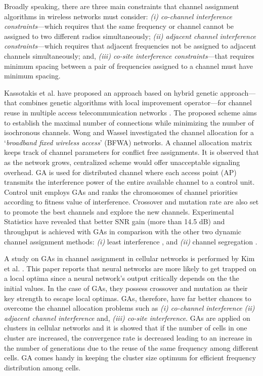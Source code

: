 \documentclass[journal]{IEEEtran}
\begin{document}
Broadly speaking, there are three main constraints that channel assignment algorithms in wireless networks must consider: \emph{(i) co-channel interference constraints}---which requires that the same frequency or channel cannot be assigned to two different radios simultaneously; \emph{(ii) adjacent channel interference constraints}---which requires that adjacent frequencies not be assigned to adjacent channels simultaneously; and, \emph{(iii) co-site interference constraints}---that requires minimum spacing between a pair of frequencies assigned to a channel must have minimum spacing. 

Kassotakis et al. have proposed an approach based on hybrid genetic approach---that combines genetic algorithms with local improvement operator---for channel reuse in multiple access telecommunication networks \cite{kassotakis2000hybrid}. The proposed scheme aims to establish the maximal number of connections while minimizing the number of isochronous channels. Wong and Wassel \cite{wong2002dynamic} investigated the channel allocation for a `\textit{broadband fixed wireless access}' (BFWA) networks. A channel allocation matrix keeps track of channel parameters for conflict free assignments. It is observed that as the network grows, centralized scheme would offer unacceptable signaling overhead. GA is used for distributed channel where each access point (AP) transmits the interference power of the entire available channel to a control unit. Control unit employs GAs and ranks the chromosomes of channel priorities according to fitness value of interference. Crossover and mutation rate are also set to promote the best channels and explore the new channels. Experimental Statistics have revealed that better SNR gain (more than 14.5 dB) and throughput is achieved with GAs in comparison with the other two dynamic channel assignment methods: \emph{(i)} least interference \cite{cheng1999wireless}, and \emph{(ii)} channel segregation \cite{akaiwa1993channel}. 

 A study on GAs in channel assignment in cellular networks is performed by Kim et al. \cite{kim1996channel}. This paper reports that neural networks are more likely to get trapped on a local optima since a neural network's output critically depends on the the initial values. In the case of GAs, they possess crossover and mutation as their key strength to escape local optimas. GAs, therefore, have far better chances to overcome the channel allocation problems such as \emph{(i) co-channel interference} \emph{(ii) adjacent channel interference} and, \emph{(iii) co-site interference}. GAs are applied on clusters in cellular networks and it is showed that if the number of cells in one cluster are increased, the convergence rate is decreased leading to an increase in the number of generations due to the reuse of the same frequency among different cells. GA comes handy in keeping the cluster size optimum for efficient frequency distribution among cells.
\end{document}
